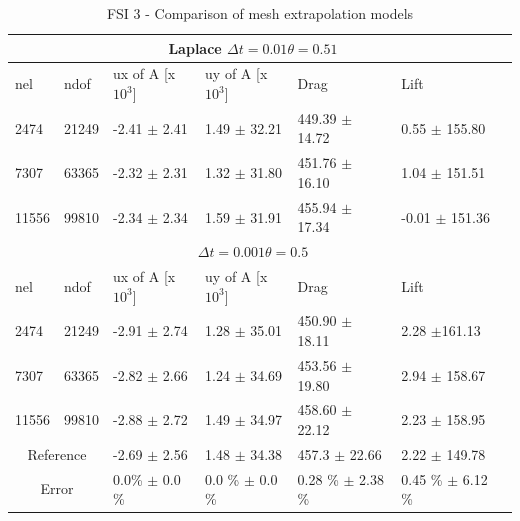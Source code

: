 \begin{table}[h!]
\centering
\caption{FSI 3 - Comparison of mesh extrapolation models}
\label{my-label}
\begin{tabular}{ |p{1cm}||p{1cm}|p{2.7cm}|p{2.7cm}|p{2.9cm}|p{3.1cm}|p{1.2cm}|}
 \hline
  \multicolumn{6}{|c|}{Laplace \hspace{2mm} $\Delta t = 0.01 \theta = 0.51$} \\
   \hline
nel & ndof & ux of A [x $10^{3}$]  &uy of A [x $10^{3}$]& Drag  & Lift \\
 \hline
 2474    & 21249  & -2.41 $\pm$   2.41 & 1.49     $\pm$   32.21 & 449.39       $\pm$   14.72 & 0.55 $\pm$   155.80  \\
 7307    & 63365  & -2.32    $\pm$   2.31 & 1.32 $\pm$    31.80 & 451.76  $\pm$   16.10 & 1.04      $\pm$   151.51  \\
 11556   & 99810  & -2.34  $\pm$   2.34  & 1.59   $\pm$  31.91 & 455.94       $\pm$ 17.34 & -0.01   $\pm$   151.36 \\
 \hline
  \multicolumn{6}{|c|}{$\Delta t = 0.001 \theta = 0.5$} \\
   \hline
 nel & ndof & ux of A [x $10^{3}$]  &uy of A [x $10^{3}$]& Drag  & Lift \\
    \hline
 2474    & 21249  & -2.91     $\pm$   2.74 & 1.28   $\pm$   35.01 & 450.90      $\pm$  18.11 & 2.28       $\pm$161.13 \\
 7307    & 63365  & -2.82    $\pm$   2.66& 1.24     $\pm$   34.69 & 453.56       $\pm$ 19.80 & 2.94     $\pm$ 158.67 \\
 11556   & 99810  & -2.88     $\pm$   2.72 & 1.49   $\pm$ 34.97 & 458.60   $\pm$ 22.12 & 2.23    $\pm$ 158.95 \\
 \hline
  \multicolumn{2}{|c|}{Reference} & -2.69 $\pm$  2.56                    & 1.48  $\pm$  34.38                   & 457.3  $\pm$  22.66        & 2.22  $\pm$ 149.78           \\
  \hline
    \multicolumn{2}{|c|}{Error}  & 0.0\% $\pm$ 0.0 \% & 0.0 \% $\pm$ 0.0 \% & 0.28 \% $\pm$ 2.38 \% & 0.45 \% $\pm$ 6.12 \%\\
   \hline
\end{tabular}
\end{table}


